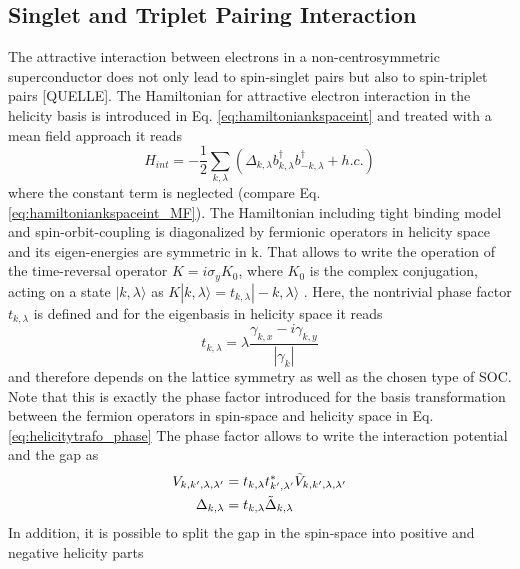 \subsection{Singlet and Triplet Pairing Interaction}
The attractive interaction between electrons in a non-centrosymmetric superconductor does not only lead to spin-singlet pairs but also to spin-triplet pairs [QUELLE]. 
The Hamiltonian for attractive electron interaction in the helicity basis is introduced in Eq. \ref{eq:hamiltoniankspaceint} and treated with a mean field approach it reads
\begin{equation}
    H_{int} = -\frac{1}{2} \sum_{k,\lambda}\left( \Delta_{k,\lambda} b^{\dag}_{k,\lambda}b^{\dag}_{-k,\lambda} + h.c.\right)
\end{equation}
where the constant term is neglected (compare Eq. \ref{eq:hamiltoniankspaceint_MF}).\newline
The Hamiltonian including tight binding model and spin-orbit-coupling is diagonalized by fermionic operators in helicity space and its eigen-energies are symmetric in k.
That allows to write the operation of the time-reversal operator $K = i \sigma_y K_0$, where $K_0$ is the complex conjugation, acting on a state $|k,\lambda\rangle$ as $K|k,\lambda\rangle = t_{k,\lambda} |-k,\lambda\rangle$ \cite{samokhin2008gap}.
Here, the nontrivial phase factor $t_{k,\lambda}$ is defined and for the eigenbasis in helicity space it reads
\begin{equation}\label{eq:phasefactor_t}
    t_{k,\lambda} = \lambda \frac{\gamma_{k,x} - i \gamma_{k,y} }{|\gamma_k|}
\end{equation}
and therefore depends on the lattice symmetry as well as the chosen type of SOC.
Note that this is exactly the phase factor introduced for the basis transformation between the fermion operators in spin-space and helicity space in Eq. \ref{eq:helicitytrafo_phase} \newline
The phase factor allows to write the interaction potential and the gap as 
\begin{align}\label{eq:int_potential_delta_phase}
    V_{k,k',\lambda, \lambda'} &= t_{k,\lambda}t^*_{k',\lambda'} \Tilde{V}_{k,k',\lambda, \lambda'} \\
    \Delta_{k,\lambda} &= t_{k,\lambda}\Tilde{\Delta}_{k,\lambda}
\end{align}
In addition, it is possible to split the gap in the spin-space into positive and negative helicity parts 
